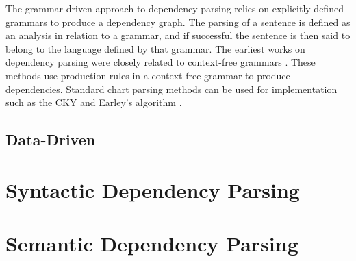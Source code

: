 The grammar-driven approach to dependency parsing relies on explicitly defined grammars to produce a dependency graph. The parsing of a sentence is defined as an analysis in relation to a grammar, and if successful the sentence is then said to belong to the language defined by that grammar. The earliest works on dependency parsing were closely related to context-free grammars \cite{KublerEtAl:09}. These methods use production rules in a context-free grammar to produce dependencies. Standard chart parsing methods can be used for implementation such as the CKY \cite{Younger:67} and Earley's algorithm \cite{Early:70}.

\subsection{Data-Driven}
\label{data-driven}

\section{Syntactic Dependency Parsing}
\label{syntactic parsing}

\section{Semantic Dependency Parsing}
\label{semantic parsing}
